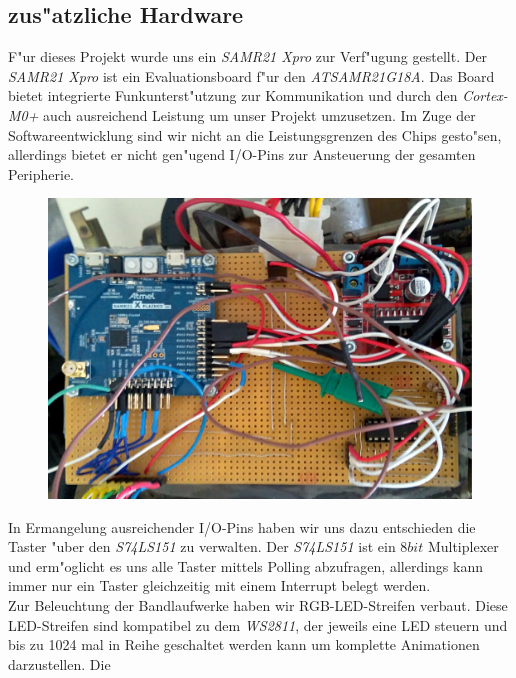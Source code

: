 \documentclass[a4paper]{article}
\begin{document}
  \subsection{zus"atzliche Hardware}
    \label{sec:hardware_additional}
    F"ur dieses Projekt wurde uns ein \textit{SAMR21 Xpro} zur Verf"ugung
    gestellt. Der \textit{SAMR21 Xpro} ist ein Evaluationsboard f"ur den
    \textit{ATSAMR21G18A}. Das Board bietet integrierte Funkunterst"utzung zur
    Kommunikation und durch den \textit{Cortex-M0+} auch ausreichend Leistung
    um unser Projekt umzusetzen. Im Zuge der Softwareentwicklung sind wir nicht
    an die Leistungsgrenzen des Chips gesto"sen, allerdings bietet er nicht
    gen"ugend I/O-Pins zur Ansteuerung der gesamten Peripherie.\\
    \begin{figure}
      \centering
      \label{figure:Hardwareplattform}
      \includegraphics[scale=0.05]{Platine.jpg}
    \end{figure}
    In Ermangelung ausreichender I/O-Pins haben wir uns dazu entschieden die
    Taster "uber den \textit{S74LS151} zu verwalten. Der \textit{S74LS151} ist
    ein \( 8 bit \) Multiplexer und erm"oglicht es uns alle Taster mittels
    Polling abzufragen, allerdings kann immer nur ein Taster gleichzeitig mit
    einem Interrupt belegt werden.\\ Zur Beleuchtung der Bandlaufwerke haben
    wir RGB-LED-Streifen verbaut. Diese LED-Streifen sind kompatibel zu dem
    \textit{WS2811}, der jeweils eine LED steuern und bis zu 1024 mal in Reihe
    geschaltet werden kann um komplette Animationen darzustellen. Die
\end{document}
